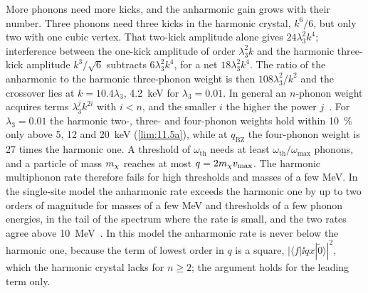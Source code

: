 More phonons need more kicks, and the anharmonic gain grows with their number. Three phonons need three kicks in the harmonic crystal, $k^6/6$, but only two with one cubic vertex. That two-kick amplitude alone gives $24\lambda_3^2k^4$; interference between the one-kick amplitude of order $\lambda_3^2k$ and the harmonic three-kick amplitude $k^3/\sqrt6$ subtracts $6\lambda_3^2k^4$, for a net $18\lambda_3^2k^4$. The ratio of the anharmonic to the harmonic three-phonon weight is then $108\lambda_3^2/k^2$ and the crossover lies at $k = 10.4\lambda_3$, \SI{4.2}{keV} for $\lambda_3 = 0.01$. In general an $n$-phonon weight acquires terms $\lambda_3^{j}k^{2i}$ with $i < n$, and the smaller $i$ the higher the power $j$~\cite[Eqs.~(39), (45)--(48)]{lin2024anharmonic}. For $\lambda_3 = 0.01$ the harmonic two-, three- and four-phonon weights hold within \SI{10}{\percent} only above 5, 12 and \SI{20}{keV} (\cref{lim:11.5a}), while at $q_{\mathrm{BZ}}$ the four-phonon weight is 27 times the harmonic one. A threshold of $\omega_{\mathrm{th}}$ needs at least $\omega_{\mathrm{th}}/\omega_{\mathrm{max}}$ phonons, and a particle of mass $m_{\chi}$ reaches at most $q = 2m_{\chi} v_{\mathrm{max}}$. The harmonic multiphonon rate therefore fails for high thresholds and masses of a few MeV. In the single-site model the anharmonic rate exceeds the harmonic one by up to two orders of magnitude for masses of a few MeV and thresholds of a few phonon energies, in the tail of the spectrum where the rate is small, and the two rates agree above \SI{10}{MeV}~\cite[Sect.~IV\,A]{lin2024anharmonic}. In this model the anharmonic rate is never below the harmonic one, because the term of lowest order in $q$ is a square, $|\langle f|\ii qx|\tilde0\rangle|^2$, which the harmonic crystal lacks for $n \ge 2$; the argument holds for the leading term only.

